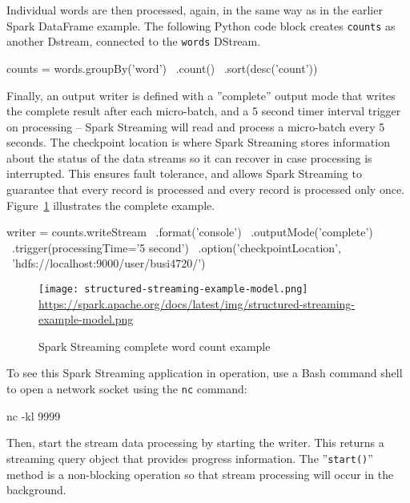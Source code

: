 Individual words are then processed, again, in the same way as in the earlier Spark DataFrame example. The following Python code block creates \texttt{counts} as another Dstream, connected to the \texttt{words} DStream.

\begin{pythoncode}
counts = words.groupBy('word') \
              .count() \
              .sort(desc('count'))
\end{pythoncode}

Finally, an output writer is defined with a ''complete'' output mode that writes the complete result after each micro-batch, and a 5 second timer interval trigger on processing -- Spark Streaming will read and process a micro-batch every 5 seconds. The checkpoint location is where Spark Streaming stores information about the status of the data streams so it can recover in case processing is interrupted. This ensures fault tolerance, and allows Spark Streaming to guarantee that every record is processed and every record is processed only once. Figure~\ref{fig:streamingexample} illustrates the complete example.

\begin{pythoncode}
writer = counts.writeStream \
           .format('console') \
           .outputMode('complete') \
           .trigger(processingTime='5 second') \
           .option('checkpointLocation', \
               'hdfs://localhost:9000/user/busi4720/')
\end{pythoncode}

\begin{figure}
\centering

\texttt{[image: structured-streaming-example-model.png]} \\

\scriptsize\url{https://spark.apache.org/docs/latest/img/structured-streaming-example-model.png}
\caption{Spark Streaming complete word count example}
\label{fig:streamingexample}
\end{figure}

To see this Spark Streaming application in operation, use a Bash command shell to open a network socket using the \texttt{nc} command:

\begin{bashcode}
nc -kl 9999
\end{bashcode}

Then, start the stream data processing by starting the writer. This returns a streaming query object that provides progress information. The ''\texttt{start()}'' method is a non-blocking operation so that stream processing will occur in the background.

